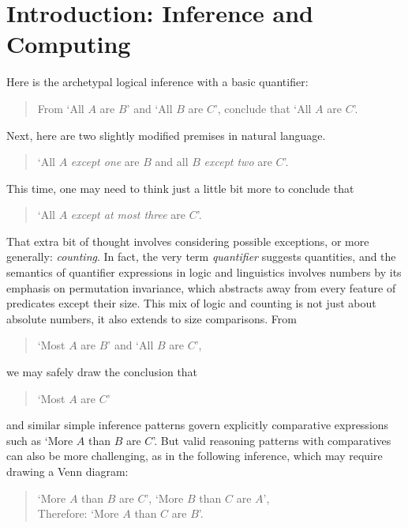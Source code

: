\documentclass[12pt,oneside,reqno]{amsart}
\theoremstyle{definition}
\begin{document}
\newpage

\section{Introduction: Inference and Computing}


Here is the archetypal logical inference with a basic quantifier: 

\begin{quote} From `All $A$ are $B$' and `All $B$ are $C$', conclude that `All $A$ are $C$'. \end{quote}
Next, here are two slightly modified premises in natural language. 

\begin{quote} `All $A$ \emph{except one} are $B$ and all $B$ \emph{except two} are $C$'. \end{quote}
This time, one may need to think just a little bit more to conclude that \begin{quote} `All $A$ \emph{except at most three} are $C$'. \end{quote}
That extra bit of thought involves considering possible exceptions, or more generally: \emph{counting}. In fact, the very term \emph{quantifier} suggests quantities, and the semantics of quantifier expressions in logic and linguistics  involves numbers by its emphasis on  permutation invariance, which abstracts away from every feature of predicates except their size. This mix of logic and counting is not just about absolute numbers, it also extends to size comparisons. From \begin{quote}`Most $A$ are $B$' and `All $B$ are $C$',\end{quote} we may safely draw the conclusion that  \begin{quote} `Most $A$ are $C$' \end{quote} and similar simple inference patterns govern explicitly comparative expressions such as `More $A$ than $B$ are $C$'. But valid reasoning patterns with comparatives can also be more challenging, as in the following  inference, which may require drawing a Venn diagram:
\vspace{0.5ex}
\begin{quote}
`More $A$ than $B$ are $C$', `More $B$ than $C$ are $A$',  \vspace{0.5ex}  \\
 Therefore: `More $A$ than $C$ are $B$'.
\vspace{0.5ex}
    \end{quote}
\end{document}
